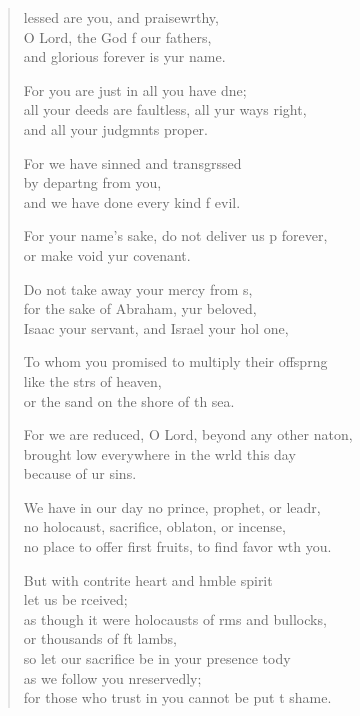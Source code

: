 \settowidth{\versewidth}{no place to offer first fruits, to find favor with you.}
\begin{verse}%
  \begin{patverse}
lessed are you, and praisewrthy,\Flex\\
O Lord, the God f our fathers,\Med\\
and glorious forever is yur name.

For you are just in all you have dne;\Flex\\
all your deeds are faultless, all yur ways right,\Med\\
and all your judgmnts proper.

For we have sinned and transgrssed\Flex\\
by depart\pointup{\i}ng from you,\Med\\
and we have done every kind f evil.

For your name’s sake, do not deliver us p forever,\Med\\
or make void yur covenant.

Do not take away your mercy from s,\Flex\\
for the sake of Abraham, yur beloved,\Med\\
Isaac your servant, and Israel your hol one,

To whom you promised to multiply their offspr\pointup{\i}ng\Flex\\
like the strs of heaven,\Med\\
or the sand on the shore of th sea.

For we are reduced, O Lord, beyond any other nat\pointup{\i}on,\Flex\\
brought low everywhere in the wrld this day\Med\\
because of ur sins.

We have in our day no prince, prophet, or leadr,\Flex\\
no holocaust, sacrifice, oblat\pointup{\i}on, or incense,\Med\\
no place to offer first fruits, to find favor w\pointup{\i}th you.

But with contrite heart and hmble spirit\Med\\
let us be rceived;\\
as though it were holocausts of rms and bullocks,\Med\\
or thousands of ft lambs,\\
so let our sacrifice be in your presence tody\Flex\\
as we follow you nreservedly;\Med\\
for those who trust in you cannot be put t shame.


\end{patverse}
\end{verse}
